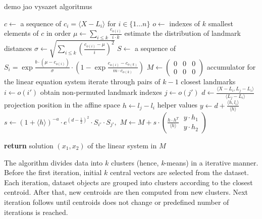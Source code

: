 \begin{algorithm}
\caption{demo jao vysazet algoritmus }
\label{alg:embedsom}
\begin{algorithmic}[1]
\State $c \gets$ a sequence of $c_i = \langle X-L_i \rangle$ for $i\in\{1\dots n\}$
\State $o \gets$ indexes of $k$ smallest elements of $c$ in order
\State $\mu \gets \sum_{i\leq k}\frac{c_{o(i)}}{i\cdot k}$ \Comment estimate the distribution of landmark distances
\State $\sigma \gets \sqrt{\sum_{i\leq k}\left(\frac{c_{o(i)}-\mu}{i}\right)^2}$
\State $S \gets$ a sequence of $S_i =
 \exp\frac{b\cdot\left(\mu-c_{o(i)}\right)}{\sigma}
 \cdot
 \left(1-\exp\frac{c_{o(i)}-c_{o(k)}}
 {m\cdot c_{o(k)}}\right)$
\State $M \gets \left(\begin{array}{ll|l}0 & 0 & 0 \\ 0 & 0 & 0 \end{array}\right)$ \Comment accumulator for the linear equation system
 \Comment iterate through pairs of $k-1$ closest landmarks
\State $i \gets o(i')$ \Comment obtain non-permuted landmark indexes
\State $j \gets o(j')$
\State $d \gets \frac{\langle X-L_i, L_j-L_i\rangle}{\langle L_j-L_i\rangle}$ \Comment projection position in the affine space
\State $h \gets l_j - l_i$ \Comment helper values
\State $y \gets d+\frac{\langle h, l_i \rangle}{\langle h \rangle}$
\State $s \gets (1+\langle h \rangle)^{-a} \cdot e^{(d-\frac{1}{2})^2}\cdot S_{i'}\cdot S_{j'},$
\State $M \gets M + s\cdot\left(\frac{h\cdot h^T}{\langle h \rangle}\ \begin{array}{|c}y\cdot h_1\\y\cdot h_2\end{array}\right)$
\EndFor
\EndFor

\State \textbf{return} solution $(x_1, x_2)$ of the linear system in $M$
\EndProcedure
\end{algorithmic}
\end{algorithm}


The algorithm divides data into $k$ clusters (hence, \emph{k}-means) in a iterative manner. Before the first iteration, initial $k$ central vectors are selected from the dataset. Each iteration, dataset objects are grouped into clusters according to the closest centroid. After that, new centroids are then computed from new clusters. Next iteration follows until centroids does not change or predefined number of iterations is reached. 

